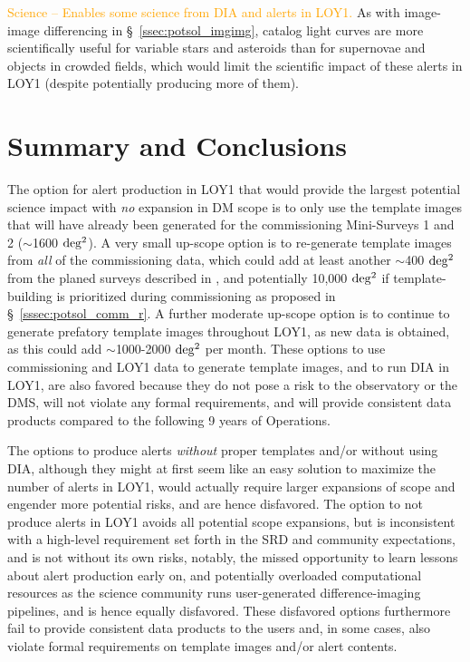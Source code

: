 \documentclass[DM,lsstdraft,toc]{lsstdoc}
\begin{document}
\textcolor{orange}{Science -- Enables some science from DIA and alerts in LOY1.}
As with image-image differencing in \S~\ref{ssec:potsol_imgimg}, catalog light curves are more scientifically useful for variable stars and asteroids than for supernovae and objects in crowded fields, which would limit the scientific impact of these alerts in LOY1 (despite potentially producing more of them).


\clearpage
\section{Summary and Conclusions}\label{sec:rec}

The option for alert production in LOY1 that would provide the largest potential science impact with {\em no} expansion in DM scope is to only use the template images that will have already been generated for the commissioning Mini-Surveys 1 and 2 ($\sim$1600 $\rm deg^2$).
A very small up-scope option is to re-generate template images from {\em all} of the commissioning data, which could add at least another $\sim$400 $\rm deg^2$ from the planed surveys described in , and potentially 10,000 $\rm deg^2$ if template-building is prioritized during commissioning as proposed in \S~\ref{sssec:potsol_comm_r}.
A further moderate up-scope option is to continue to generate prefatory template images throughout LOY1, as new data is obtained, as this could add $\sim$1000-2000 $\rm deg^2$ per month.
These options to use commissioning and LOY1 data to generate template images, and to run DIA in LOY1, are also favored because they do not pose a risk to the observatory or the DMS, will not violate any formal requirements, and will provide consistent data products compared to the following 9 years of Operations. 

The options to produce alerts {\it without} proper templates and/or without using DIA, although they might at first seem like an easy solution to maximize the number of alerts in LOY1, would actually require larger expansions of scope and engender more potential risks, and are hence disfavored.
The  option to not produce alerts in LOY1 avoids all potential scope expansions, but is inconsistent with a high-level requirement set forth in the SRD and community expectations, and is not without its own risks, notably,  the missed opportunity to learn lessons about alert production early on, and potentially overloaded computational resources as the science community runs user-generated difference-imaging pipelines, and is hence equally disfavored. 
These disfavored options furthermore fail to provide consistent data products to the users and, in some cases, also violate formal requirements on template images and/or alert contents.
\end{document}
